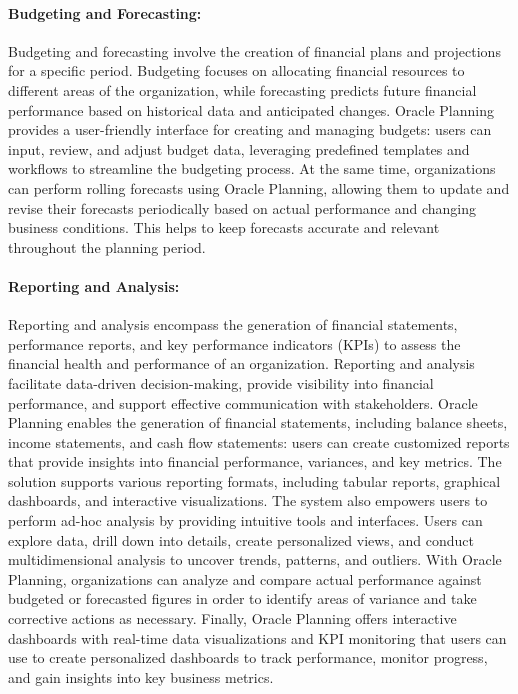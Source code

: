 \documentclass[12pt,a4paper,openright,twoside]{book}
\begin{document}
\paragraph{Budgeting and Forecasting:}

Budgeting and forecasting involve the creation of financial plans and projections for a specific period.
%
Budgeting focuses on allocating financial resources to different areas of the organization, while forecasting predicts future financial performance based on historical data and anticipated changes. 
%
Oracle Planning provides a user-friendly interface for creating and managing budgets: users can input, review, and adjust budget data, leveraging predefined templates and workflows to streamline the budgeting process. 
%
At the same time, organizations can perform rolling forecasts using Oracle Planning, allowing them to update and revise their forecasts periodically based on actual performance and changing business conditions. 
%
This helps to keep forecasts accurate and relevant throughout the planning period.

\paragraph{Reporting and Analysis:}

Reporting and analysis encompass the generation of financial statements, performance reports, and key performance indicators (KPIs) to assess the financial health and performance of an organization. 
%
Reporting and analysis facilitate data-driven decision-making, provide visibility into financial performance, and support effective communication with stakeholders.
%
Oracle Planning enables the generation of financial statements, including balance sheets, income statements, and cash flow statements: users can create customized reports that provide insights into financial performance, variances, and key metrics. 
%
The solution supports various reporting formats, including tabular reports, graphical dashboards, and interactive visualizations.
%
The system also empowers users to perform ad-hoc analysis by providing intuitive tools and interfaces. 
%
Users can explore data, drill down into details, create personalized views, and conduct multidimensional analysis to uncover trends, patterns, and outliers.
%
With Oracle Planning, organizations can analyze and compare actual performance against budgeted or forecasted figures in order to identify areas of variance and take corrective actions as necessary.
%
Finally, Oracle Planning offers interactive dashboards with real-time data visualizations and KPI monitoring that users can use to create personalized dashboards to track performance, monitor progress, and gain insights into key business metrics.
\end{document}

